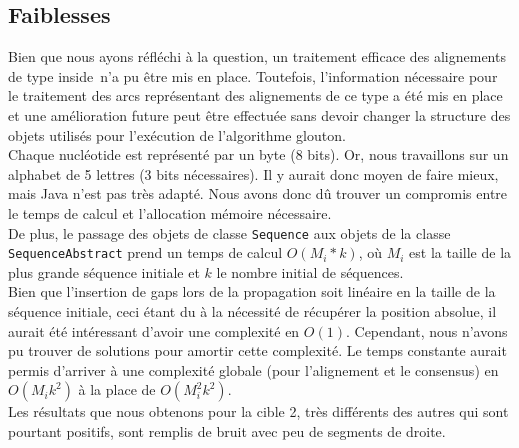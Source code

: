 \subsection{Faiblesses}

Bien que nous ayons réfléchi à la question, un traitement efficace des alignements de type \og inside\fg~n'a pu être mis en place. Toutefois, l'information nécessaire pour le traitement des arcs représentant des alignements de ce type a été mis en place et une amélioration future peut être effectuée sans devoir changer la structure des objets utilisés pour l'exécution de l'algorithme glouton.\\

Chaque nucléotide est représenté par un byte (8 bits). Or, nous travaillons sur un alphabet de 5 lettres (3 bits nécessaires). Il y aurait donc moyen de faire mieux, mais Java n'est pas très adapté. Nous avons donc dû trouver un compromis entre le temps de calcul et l'allocation mémoire nécessaire.\\

De plus, le passage des objets de classe \verb|Sequence| aux objets de la classe
\verb|SequenceAbstract| prend un temps de calcul $O(M_{i} * k)$, où $M_{i}$ est
la taille de la plus grande séquence initiale et $k$ le nombre initial de
séquences.\\

Bien que l'insertion de gaps lors de la propagation soit
linéaire en la taille de la séquence initiale, ceci étant du à la nécessité de
récupérer la position absolue, il aurait été intéressant d'avoir une complexité
en $O(1)$. Cependant, nous n'avons pu trouver de solutions pour amortir cette
complexité. Le temps constante aurait permis d'arriver à une complexité globale
(pour l'alignement et le consensus) en $O(M_{i} k ^{2})$ à la place de
$O(M_{i}^{2} k^{2})$.\\

Les résultats que nous obtenons pour la cible 2, très différents des autres qui
sont pourtant positifs, sont remplis de bruit avec peu de segments de droite.
